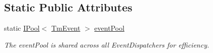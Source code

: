 \subsection*{Static Public Attributes}
\begin{DoxyCompactItemize}
\item 
\hypertarget{classstrange_1_1extensions_1_1dispatcher_1_1eventdispatcher_1_1impl_1_1_event_dispatcher_afd112427b16a6385d90688abbc352174}{static \hyperlink{interfacestrange_1_1extensions_1_1pool_1_1api_1_1_i_pool}{I\-Pool}$<$ \hyperlink{classstrange_1_1extensions_1_1dispatcher_1_1eventdispatcher_1_1impl_1_1_tm_event}{Tm\-Event} $>$ \hyperlink{classstrange_1_1extensions_1_1dispatcher_1_1eventdispatcher_1_1impl_1_1_event_dispatcher_afd112427b16a6385d90688abbc352174}{event\-Pool}}\label{classstrange_1_1extensions_1_1dispatcher_1_1eventdispatcher_1_1impl_1_1_event_dispatcher_afd112427b16a6385d90688abbc352174}

\begin{DoxyCompactList}\small\item\em The event\-Pool is shared across all Event\-Dispatchers for efficiency. \end{DoxyCompactList}\end{DoxyCompactItemize}
